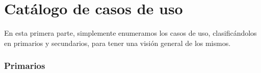 \documentclass[spanish,a4paper,11pt, twoside]{report}	%
\begin{document}

\setcounter{section}{0}

\part{Catálogo de casos de uso} %
En esta primera parte, simplemente enumeramos los casos de uso, clasificándolos en primarios y secundarios, para tener una visión general de los mismos.
\section{Primarios} 				%
\end{document}
